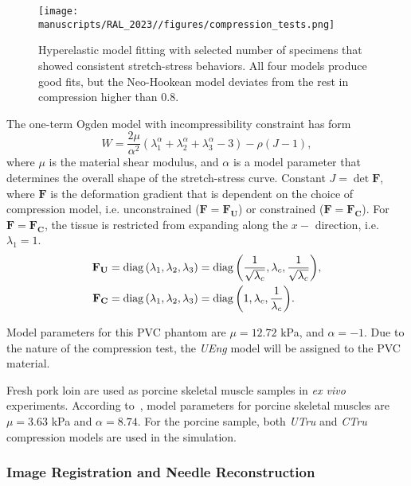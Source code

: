 \begin{figure}[t]
  \centering
  \texttt{[image: manuscripts/RAL\_2023//figures/compression\_tests.png]}
  \caption{Hyperelastic model fitting with selected number of specimens that showed consistent stretch-stress behaviors. All four models produce good fits, but the Neo-Hookean model deviates from the rest in compression higher than 0.8.}
  \label{fig:hyperelastic_model_fitting}
\end{figure}

The one-term Ogden model with incompressibility constraint has form
\begin{equation}
  \label{eq:incompressible_ogden}
  W = \frac{2\mu}{\alpha^2}(\lambda_1^{\alpha} + \lambda_2^{\alpha} + \lambda_3^{\alpha} - 3) - \rho (J - 1),
\end{equation}
where $\mu$ is the material shear modulus, and $\alpha$ is a model parameter that determines the overall shape of the stretch-stress curve. Constant $J = \det{\mathbf{F}}$, where $\mathbf{F}$ is the deformation gradient that is dependent on the choice of compression model, i.e. unconstrained ($\mathbf{F = F_U}$) or constrained ($\mathbf{F = F_C}$). For $\mathbf{F = F_C}$, the tissue is restricted from expanding along the $x-$ direction, i.e. $\lambda_1=1$.
\begin{align}
  \mathbf{F_U} &= \operatorname{diag}{\left( \lambda_1, \lambda_2, \lambda_3 \right)} = \operatorname{diag}{\left(\frac{1}{\sqrt{\lambda_c}}, \lambda_c, \frac{1}{\sqrt{\lambda_c}} \right)},
                 \label{eq:unconstrained_deformation_gradient} \\
  \mathbf{F_C} &= \operatorname{diag}{\left( \lambda_1, \lambda_2, \lambda_3 \right)} = \operatorname{diag}{\left( 1, \lambda_c, \frac{1}{\lambda_c}\right)}.
                 \label{eq:constrained_deformation_gradient}
\end{align}

Model parameters for this PVC phantom are $\mu = 12.72$ kPa, and $\alpha = -1$. Due to the nature of the compression test, the \textit{UEng} model will be assigned to the PVC material.

Fresh pork loin are used as porcine skeletal muscle samples in \textit{ex vivo} experiments. According to~\parencite{moVitroCompressiveProperties2020}, model parameters for porcine skeletal muscles are $\mu = 3.63$ kPa and $\alpha = 8.74$. For the porcine sample, both \textit{UTru} and \textit{CTru} compression models are used in the simulation.

\subsubsection{Image Registration and Needle Reconstruction}
\label{sec:chap-3-image-reg-and-needle-recon}

